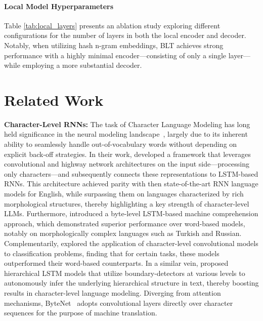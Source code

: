 \paragraph{Local Model Hyperparameters} Table \ref{tab:local_layers} presents an ablation study exploring different configurations for the number of layers in both the local encoder and decoder. Notably, when utilizing hash n-gram embeddings, {\textsc BLT} achieves strong performance with a highly minimal encoder—consisting of only a single layer—while employing a more substantial decoder.

\section{Related Work}
\label{section:related_work}

\textbf{Character-Level RNNs:} The task of Character Language Modeling has long held significance in the neural modeling landscape~\citep{sutskever2011generating,mikolov2012subword,graves2013generating}, largely due to its inherent ability to seamlessly handle out-of-vocabulary words without depending on explicit back-off strategies. In their work, \cite{kim2016character} developed a framework that leverages convolutional and highway network architectures on the input side—processing only characters—and subsequently connects these representations to LSTM-based RNNs. This architecture achieved parity with then state-of-the-art RNN language models for English, while surpassing them on languages characterized by rich morphological structures, thereby highlighting a key strength of character-level LLMs. Furthermore, \cite{kenter2018byte} introduced a byte-level LSTM-based machine comprehension approach, which demonstrated superior performance over word-based models, notably on morphologically complex languages such as Turkish and Russian. Complementarily, \cite{zhang2015character} explored the application of character-level convolutional models to classification problems, finding that for certain tasks, these models outperformed their word-based counterparts. In a similar vein, \citet{chung2019hierarchical} proposed hierarchical LSTM models that utilize boundary-detectors at various levels to autonomously infer the underlying hierarchical structure in text, thereby boosting results in character-level language modeling. Diverging from attention mechanisms, ByteNet~\cite{kalchbrenner2016neural} adopts convolutional layers directly over character sequences for the purpose of machine translation.

